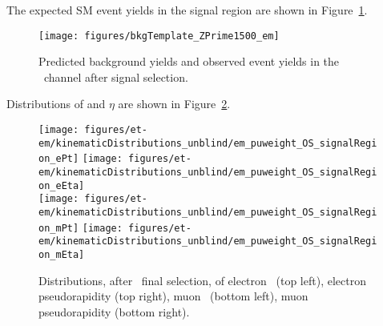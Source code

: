 The expected SM event yields in the signal region are shown in
Figure~\ref{fig:em_sm_template_and_mt}.
\begin{figure}[thbp!]\centering
  \texttt{[image: figures/bkgTemplate\_ZPrime1500\_em]} \\
  \caption{\label{fig:em_sm_template_and_mt} Predicted background
    yields and observed event yields in the \tetm ~channel after signal
    selection.}
\end{figure}

Distributions of \pt and $\eta$ are shown in Figure~\ref{fig:em_sr_pt_eta}.
\begin{figure}[thbp!]\centering
  \texttt{[image: figures/et-em/kinematicDistributions\_unblind/em\_puweight\_OS\_signalRegion\_ePt]}
  \texttt{[image: figures/et-em/kinematicDistributions\_unblind/em\_puweight\_OS\_signalRegion\_eEta]} \\
  \texttt{[image: figures/et-em/kinematicDistributions\_unblind/em\_puweight\_OS\_signalRegion\_mPt]}
  \texttt{[image: figures/et-em/kinematicDistributions\_unblind/em\_puweight\_OS\_signalRegion\_mEta]}
  \caption{\label{fig:em_sr_pt_eta} Distributions, after \tetm ~final
    selection, of electron \pt ~(top left), electron pseudorapidity
    (top right), muon \pt ~(bottom left), muon pseudorapidity (bottom
    right).}
\end{figure}
